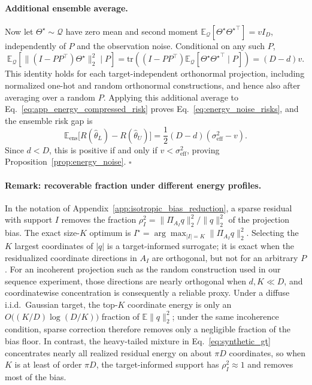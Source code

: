 \paragraph{Additional ensemble average.}
Now let $\Theta^\star\sim\mathcal Q$ have zero mean and second moment
$\mathbb E_{\mathcal Q}[\Theta^\star{\Theta^\star}^\top]=vI_D$, independently of $P$ and the observation noise.
Conditional on any such $P$,
\begin{equation}
\mathbb E_{\mathcal Q}\!\left[\|(I-PP^\top)\Theta^\star\|_2^2\mid P\right]
=\mathrm{tr}\!\left((I-PP^\top)\mathbb E_{\mathcal Q}[\Theta^\star{\Theta^\star}^\top\mid P]\right)
=(D-d)v.
\label{eq:app_energy_bias_term}
\end{equation}
This identity holds for each target-independent orthonormal projection, including normalized one-hot and random orthonormal constructions, and hence also after averaging over a random $P$.
Applying this additional average to Eq.~\eqref{eq:app_energy_compressed_risk} proves Eq.~\eqref{eq:energy_noise_risks}, and the ensemble risk gap is
\begin{equation}
\mathbb E_{\mathrm{ens}}\big[R(\hat\theta_L)-R(\hat\theta_U)\big]
=\frac12(D-d)(\sigma_{\mathrm{eff}}^2-v).
\label{eq:app_energy_risk_gap}
\end{equation}
Since $d<D$, this is positive if and only if $v<\sigma_{\mathrm{eff}}^2$, proving Proposition~\ref{prop:energy_noise}. \hfill$\square$

\paragraph{Remark: recoverable fraction under different energy profiles.}
In the notation of Appendix~\ref{app:isotropic_bias_reduction}, a sparse residual with support $I$ removes the fraction $\rho_I^2=\|\Pi_{A_I}q\|_2^2/\|q\|_2^2$ of the projection bias.
The exact size-$K$ optimum is
$I^\star=\arg\max_{|I|=K}\|\Pi_{A_I}q\|_2^2$.
Selecting the $K$ largest coordinates of $|q|$ is a target-informed surrogate; it is exact when the residualized coordinate directions in $A_I$ are orthogonal, but not for an arbitrary $P$.
For an incoherent projection such as the random construction used in our sequence experiment, those directions are nearly orthogonal when $d,K\ll D$, and coordinatewise concentration is consequently a reliable proxy.
Under a diffuse i.i.d.\ Gaussian target, the top-$K$ coordinate energy is only an $O\!\big((K/D)\log(D/K)\big)$ fraction of $\mathbb{E}\|q\|_2^2$; under the same incoherence condition, sparse correction therefore removes only a negligible fraction of the bias floor.
In contrast, the heavy-tailed mixture in Eq.~\eqref{eq:synthetic_gt} concentrates nearly all realized residual energy on about $\pi D$ coordinates, so when $K$ is at least of order $\pi D$, the target-informed support has $\rho_I^2\approx1$ and removes most of the bias.

